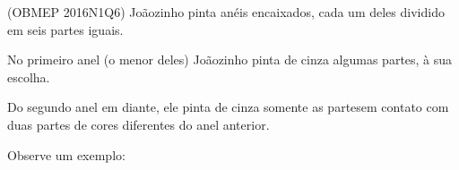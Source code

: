 \documentclass[preview]{standalone}
\begin{document}
\begin{center}
(OBMEP 2016N1Q6) Joãozinho pinta anéis encaixados, cada um deles dividido em seis partes iguais.

          No primeiro anel (o menor deles) Joãozinho pinta de cinza algumas partes, à sua escolha. 

          Do segundo anel em diante, ele pinta de cinza somente as partesem contato com duas partes de cores diferentes do anel anterior.

          Observe um exemplo:
\end{center}
\end{document}
